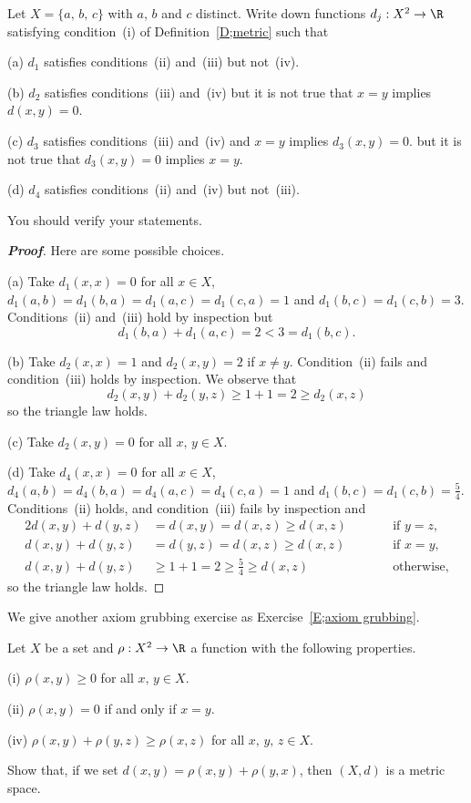 \begin{theorem}\label{P;not metric}
Let $X=\{a,\,b,\,c\}$ with $a$, $b$ and $c$
distinct. Write down functions $d_{j}:X^{2}\rightarrow\R$
satisfying condition~(i) of Definition~\ref{D;metric}
such that

(a) $d_{1}$ satisfies conditions~(ii) and~(iii) but not~(iv).

(b) $d_{2}$ satisfies conditions~(iii) and~(iv) but it is not
true that $x=y$ implies $d(x,y)=0$.

(c) $d_{3}$ satisfies conditions~(iii) and~(iv)
and $x=y$ implies $d_{3}(x,y)=0$.
but it is not
true that  $d_{3}(x,y)=0$ implies $x=y$.

(d) $d_{4}$ satisfies conditions~(ii) and~(iv) but not~(iii).

You should verify your statements.
\end{theorem}
\begin{proof}[\bf Proof] Here are some possible choices.

(a) Take $d_{1}(x,x)=0$ for all $x\in X$,
$d_{1}(a,b)=d_{1}(b,a)=d_{1}(a,c)=d_{1}(c,a)=1$
and $d_{1}(b,c)=d_{1}(c,b)=3$. Conditions~(ii) and~(iii)
hold by inspection but
\[d_{1}(b,a)+d_{1}(a,c)=2<3=d_{1}(b,c).\]

(b) Take $d_{2}(x,x)=1$
and $d_{2}(x,y)=2$ if $x\neq y$. Condition~(ii) fails
and condition~(iii) holds by inspection. We observe that
\[d_{2}(x,y)+d_{2}(y,z)\geq 1+1=2\geq d_{2}(x,z)\]
so the triangle law holds.

(c) Take
$d_{2}(x,y)=0$ for all $x,\,y\in X$.

(d) Take $d_{4}(x,x)=0$ for all $x\in X$, $d_{4}(a,b)=d_{4}(b,a)=d_{4}(a,c)=d_{4}(c,a)=1$ and $d_{1}(b,c)=d_{1}(c,b)=\tfrac{5}{4}$. Conditions~(ii) holds,
and condition~(iii) fails by inspection and
\begin{alignat*}{2}
d(x,y)+d(y,z)&=d(x,y)=d(x,z)\geq d(x,z)&&\qquad\text{if $y=z$},\\
d(x,y)+d(y,z)&=d(y,z)=d(x,z)\geq d(x,z)&&\qquad\text{if $x=y$},\\
d(x,y)+d(y,z)&\geq
1+1=2\geq\tfrac{5}{4}\geq d(x,z)&&\qquad\text{otherwise,}
\end{alignat*}
so the triangle law holds.
\end{proof}

We give another axiom grubbing exercise as Exercise~\ref{E;axiom grubbing}.
\begin{problem} Let $X$ be a set and
$\rho:X^{2}\rightarrow\R$ a function with the
following properties.

(i) $\rho(x,y)\geq 0$ for all $x,\,y\in X$.

(ii) $\rho(x,y)=0$ if and only if $x=y$.

(iv) $\rho(x,y)+\rho(y,z)\geq \rho(x,z)$ for all $x,\,y,\,z\in X$.

\noindent Show that, if we set $d(x,y)=\rho(x,y)+\rho(y,x)$,
then $(X,d)$ is a metric space.
\end{problem}

